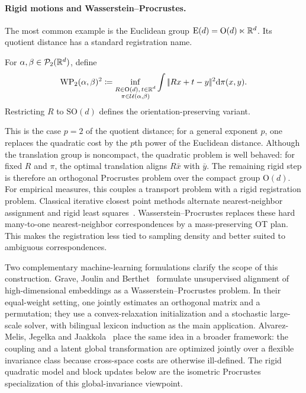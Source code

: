\paragraph{Rigid motions and Wasserstein--Procrustes.}

The most common example is the Euclidean group $\mathrm E(d)=\mathrm O(d)\ltimes\mathbb{R}^d$. Its quotient distance has a standard registration name.
\begin{defn}\label{def-wasserstein-procrustes}
For $\alpha,\beta\in\mathcal{P}_2(\mathbb{R}^d)$, define
\[
	\operatorname{WP}_2(\alpha,\beta)^2
	\coloneqq
	\inf_{\substack{R\in\mathrm O(d),\,t\in\mathbb{R}^d\\ \pi\in\mathcal{U}(\alpha,\beta)}}
	\int|\!| Rx+t-y |\!|^2\mathrm{d}\pi(x,y).
\]
Restricting \(R\) to \(\mathrm{SO}(d)\) defines the orientation-preserving variant.
\end{defn}
This is the case $p=2$ of the quotient distance; for a general exponent $p$, one replaces the quadratic cost by the $p$th power of the Euclidean distance. Although the translation group is noncompact, the quadratic problem is well behaved: for fixed $R$ and $\pi$, the optimal translation aligns $R\bar x$ with $\bar y$. The remaining rigid step is therefore an orthogonal Procrustes problem over the compact group $\mathrm O(d)$.
For empirical measures, this couples a transport problem with a rigid registration problem. Classical iterative closest point methods alternate nearest-neighbor assignment and rigid least squares~\cite{BeslMcKay1992ICP}. Wasserstein--Procrustes replaces these hard many-to-one nearest-neighbor correspondences by a mass-preserving OT plan. This makes the registration less tied to sampling density and better suited to ambiguous correspondences.

Two complementary machine-learning formulations clarify the scope of this construction. Grave, Joulin and Berthet~\cite{grave2018unsupervised} formulate unsupervised alignment of high-dimensional embeddings as a Wasserstein--Procrustes problem. In their equal-weight setting, one jointly estimates an orthogonal matrix and a permutation; they use a convex-relaxation initialization and a stochastic large-scale solver, with bilingual lexicon induction as the main application. Alvarez-Melis, Jegelka and Jaakkola~\cite{alvarez2018towards} place the same idea in a broader framework: the coupling and a latent global transformation are optimized jointly over a flexible invariance class because cross-space costs are otherwise ill-defined. The rigid quadratic model and block updates below are the isometric Procrustes specialization of this global-invariance viewpoint.

